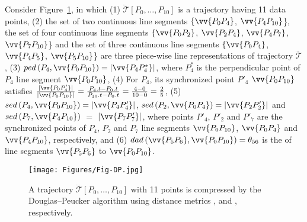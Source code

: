 \begin{example}
	\label{exm-notations}
	Consider {Figure}~\ref{fig:dp}, in which
	(1) $\dddot{\mathcal{T}}\left[P_0, \ldots, P_{10}\right]$ is a trajectory having 11 data points,
    (2) the set of two continuous line segments $\{\vv{P_0P_4}$, $\vv{P_4P_{10}}$\}, the set of four continuous line segments $\{\vv{P_0P_2}$, $\vv{P_2P_4}$, $\vv{P_4P_7}$, $\vv{P_7P_{10}}$\} and the set of three continuous line segments $\{\vv{P_0P_4}$, $\vv{P_4P_5}$, $\vv{P_5P_{10}}$\} are three piece-wise line representations of trajectory $\dddot{\mathcal{T}}$,
	(3) $ped\left(P_4, \vv{P_0P_{10}}\right)=|\vv{P_4P^*_4}|$, where $P^*_4$ is the perpendicular point of $P_4$ \wrt line segment $\vv{P_0P_{10}}$,
	(4) For $P_4$, its synchronized point $P'_4$ \wrt $\vv{P_0P_{10}}$ satisfies $\frac{|\vv{P_0P'_4}|}{|\vv{P_0P_{10}}|} = \frac{P_4.t - P_0.t}{P_{10}.t-P_0.t} = \frac{4-0}{10-0}= \frac{2}{5}$,
	(5) $sed\left(P_4, \vv{P_0P_{10}}\right)= |\vv{P_4P'_4}|$, $sed\left(P_2, \vv{P_0P_{4}}\right)= |\vv{P_2P'_2}|$ and $sed\left(P_7, \vv{P_4P_{10}}\right)$ $=$ $|\vv{P_7P'_7}|$,
	where points $P'_4$, $P'_2$ and $P'_7$ are the synchronized points of $P_4$, $P_2$ and $P_7$ \wrt line segments $\vv{P_0P_{10}}$, $\vv{P_0P_{4}}$ and $\vv{P_4P_{10}}$, respectively, and
    (6) $dad\left(\vv{P_5P_6}, \vv{P_0P_{10}}\right)=\theta_{56}$ is the \dad of line segments $\vv{P_5P_6}$ to $\vv{P_0P_{10}}$.
\end{example}


\begin{figure}[tb!]
	\centering
	\texttt{[image: Figures/Fig-DP.jpg]}\vspace{-1ex}
	\caption{\small  A trajectory $\dddot{\mathcal{T}}[P_0, \ldots, P_{10}]$ with 11 points is compressed by the Douglas--Peucker algorithm \cite{Douglas:Peucker} using distance metrics \ped, \sed and \dad, respectively.}
		\vspace{-2ex}
	\label{fig:dp}
\end{figure}




